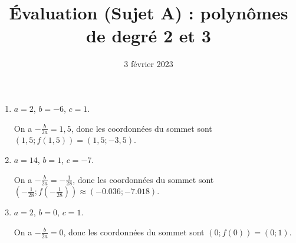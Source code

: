 \documentclass[
	classe=$1^{ere}STI2D$,
	headerTitle=Évaluation\space Chapitre\space 4
]{évaluation}
\date{3 février 2023}
\begin{document}
\title{Évaluation (Sujet A) : polynômes de degré 2 et 3}
\maketitle

\begin{exercice}
	\begin{enumerate}
		\item $a = 2$, $b = -6$, $c = 1$.

		      On a $-\frac{b}{2a} = 1,5$, donc les coordonnées du sommet sont $(1,5 ; f(1,5)) = (1,5 ; -3,5)$.
		\item $a = 14$, $b = 1$, $c = -7$.

		      On a $-\frac{b}{2a} = -\frac{1}{28}$, donc les coordonnées du sommet sont $(-\frac{1}{28} ; f(-\frac{1}{28})) ≈ (-0.036 ; -7.018)$.
		\item $a = 2$, $b = 0$, $c = 1$.

		      On a $-\frac{b}{2a} = 0$, donc les coordonnées du sommet sont $(0 ; f(0)) = (0 ; 1)$.
	\end{enumerate}
\end{exercice}
\end{document}
